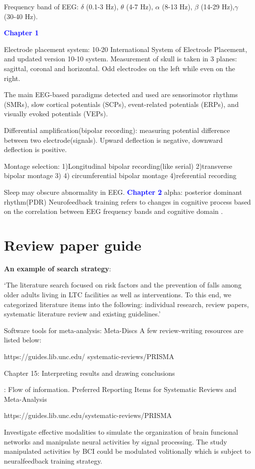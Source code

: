 \documentclass{article}
\begin{document}
Frequency band of EEG: $\delta$ (0.1-3 Hz), $\theta$ (4-7 Hz), $\alpha$ (8-13 Hz), $\beta$ (14-29 Hz),$\gamma$ (30-40 Hz).

\textcolor{blue}{\textbf{Chapter 1}}


Electrode placement system: 10-20 International System of Electrode Placement, and updated version 10-10 system. Measurement of skull is taken in 3 planes: sagittal, coronal and horizontal. Odd electrodes on the left while even on the right.

The main EEG-based paradigms detected and used are sensorimotor rhythms (SMRs), slow cortical potentials (SCPs), event-related potentials (ERPs), and visually evoked potentials (VEPs).

Differential amplification(bipolar recording): measuring potential difference between two electrode(signals). Upward deflection is negative, downward deflection is positive.

Montage selection:
1)Longitudinal bipolar recording(like serial) 2)transverse bipolar montage 3) 4) circumferential bipolar montage 4)referential recording

Sleep may obscure abnormality in EEG. 
\textcolor{blue}{\textbf{Chapter 2}}
alpha: posterior dominant rhythm(PDR)
Neurofeedback training refers to changes in cognitive process based on the correlation between EEG frequency bands and cognitive domain \cite{Lecomte_2011}. 
\section{Review paper guide}

\textbf{An example of search strategy}: 

‘The literature search focused on risk factors and the prevention of falls among older adults living in LTC facilities as well as interventions. To this end, we categorized literature items into the following: individual research, review papers, systematic literature review and existing guidelines.’

Software tools for  meta-analysis: Meta-Discs
A few review-writing resources are listed below: \par
https://guides.lib.unc.edu/
systematic-reviews/PRISMA

\begin{description}[font=$\bullet$~\normalfont\textbf]
\item [Cochrane Handbook:] Chapter 15: Interpreting results and drawing conclusions
\item [PRISMA]: Flow of information. Preferred Reporting Items for Systematic Reviews and Meta-Analysis
\item [JBI Manual for Evidence Synthesis - Chapter 12.3 The systematic review] 
\end{description}
https://guides.lib.unc.edu/systematic-reviews/PRISMA

Investigate effective modalities to simulate the organization 
of brain funcional networks and manipulate neural activities by 
signal processing. The study manipulated activities by BCI 
could be modulated volitionally which is subject to neuralfeedback training 
strategy.

\printbibliography
\end{document}

